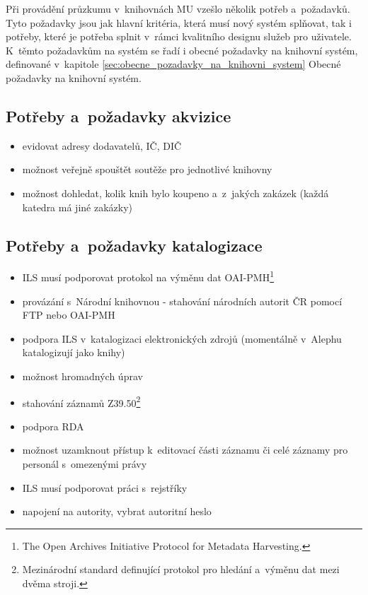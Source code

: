 \documentclass[
	11pt, oneside, printed, final, palatino, monochrome
	microtype,
	table,   %
	lof,     %
	lot     %
]{fithesis3}
\begin{document}
{Při provádění průzkumu v~knihovnách MU vzešlo několik potřeb a~požadavků. Tyto požadavky jsou jak hlavní kritéria, která musí nový systém splňovat, tak i potřeby, které je potřeba splnit v~rámci kvalitního designu služeb pro uživatele. K~těmto požadavkům na systém se řadí i obecné požadavky na knihovní systém, definované v~kapitole \ref{sec:obecne_pozadavky_na_knihovni_system} Obecné požadavky na knihovní systém.

\subsection{Potřeby a~požadavky akvizice}

\begin{itemize}
\item evidovat adresy dodavatelů, IČ, DIČ
\item možnost veřejně spouštět soutěže pro jednotlivé knihovny
\item možnost dohledat, kolik knih bylo koupeno a~z~jakých zakázek (každá katedra má jiné zakázky)
\end{itemize}

\subsection{Potřeby a~požadavky katalogizace}

\begin{itemize}
\item ILS musí podporovat protokol na výměnu dat OAI-PMH\footnote{The Open Archives Initiative Protocol for Metadata Harvesting.}
\item provázání s~Národní knihovnou - stahování národních autorit ČR pomocí FTP nebo OAI-PMH
\item podpora ILS v~katalogizaci elektronických zdrojů (momentálně v~Alephu katalogizují jako knihy)
\item možnost hromadných úprav
\item stahování záznamů Z39.50\footnote{Mezinárodní standard definující protokol pro hledání a~výměnu dat mezi dvěma stroji.}
\item podpora RDA
\item možnost uzamknout přístup k~editovací části záznamu či celé záznamy pro personál s~omezenými právy
\item ILS musí podporovat práci s~rejstříky
\item napojení na autority, vybrat autoritní heslo
\end{itemize}

}
\end{document}
